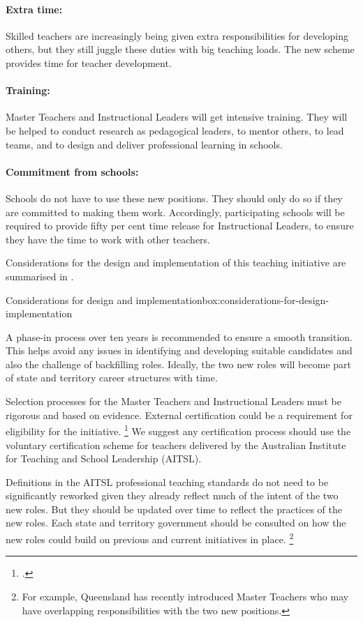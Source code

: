 \documentclass{grattan}
\begin{document}
\paragraph{Extra time:} Skilled teachers are increasingly being given extra responsibilities for developing others, but they still juggle these duties with big teaching loads.
The new scheme provides time for teacher development.

\paragraph{Training:} Master Teachers and Instructional Leaders will get intensive training.
They will be helped to conduct research as pedagogical leaders, to mentor others, to lead teams, and to design and deliver professional learning in schools.

\paragraph{Commitment from schools:} Schools do not have to use these new positions. They should only do so if they are committed to making them work. Accordingly, participating schools will be required to provide fifty per cent time release for Instructional Leaders, to ensure they have the time to work with other teachers.

Considerations for the design and implementation of this teaching initiative are summarised in .


\begin{smallbox}{Considerations for design and implementation}{box:considerations-for-design-implementation}

A phase-in process over ten years is recommended to ensure a smooth transition.
This helps avoid any issues in identifying and developing suitable candidates and also the challenge of backfilling roles.
Ideally, the two new roles will become part of state and territory career structures with time.

Selection processes for the Master Teachers and Instructional Leaders must be rigorous and based on evidence.
External certification could be a requirement for eligibility for the initiative.%
\footcite{Dinham2008TeachingTalentBest}
  We suggest any certification process should use the voluntary certification scheme for teachers delivered by the Australian Institute for Teaching and School Leadership (AITSL).

Definitions in the AITSL professional teaching standards do not need to be significantly reworked given they already reflect much of the intent of the two new roles. But they should be updated over time to reflect the practices of the new roles. Each state and territory government should be consulted on how the new roles could build on previous and current initiatives in place.%
\footnote{For example, Queensland has recently introduced Master Teachers who may have overlapping responsibilities with the two new positions.}
\end{smallbox}
\end{document}
